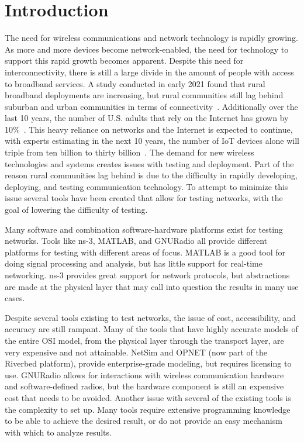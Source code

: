 \chapter{Introduction}
\label{ch:introduction}
The need for wireless communications and network technology is rapidly growing.
As more and more devices become network-enabled, the need for technology to support this rapid growth becomes apparent.
Despite this need for interconnectivity, there is still a large divide in the amount of people with access to broadband services.
A study conducted in early 2021 found that rural broadband deployments are increasing, but rural communities still lag behind suburban and urban communities in terms of connectivity~\cite{digital_divide}.
Additionally over the last 10 years, the number of U.S. adults that rely on the Internet has grown by 10\%~\cite{broadband_factsheet}.
This heavy reliance on networks and the Internet is expected to continue, with experts estimating in the next 10 years, the number of IoT devices alone will triple from ten billion to thirty billion~\cite{iot_spread}.
The demand for new wireless technologies and systems creates issues with testing and deployment.
Part of the reason rural communities lag behind is due to the difficulty in rapidly developing, deploying, and testing communication technology.
To attempt to minimize this issue several tools have been created that allow for testing networks, with the goal of lowering the difficulty of testing.\par

Many software and combination software-hardware platforms exist for testing networks.
Tools like ns-3, MATLAB, and GNURadio all provide different platforms for testing with different areas of focus.
MATLAB is a good tool for doing signal processing and analysis, but has little support for real-time networking.
ns-3 provides great support for network protocols, but abstractions are made at the physical layer that may call into question the results in many use cases.\par

Despite several tools existing to test networks, the issue of cost, accessibility, and accuracy are still rampant.
Many of the tools that have highly accurate models of the entire OSI model, from the physical layer through the transport layer, are very expensive and not attainable.
NetSim and OPNET (now part of the Riverbed platform), provide enterprise-grade modeling, but requires licensing to use.
GNURadio allows for interactions with wireless communication hardware and software-defined radios, but the hardware component is still an expensive cost that needs to be avoided.
Another issue with several of the existing tools is the complexity to set up.
Many tools require extensive programming knowledge to be able to achieve the desired result, or do not provide an easy mechanism with which to analyze results.\par

